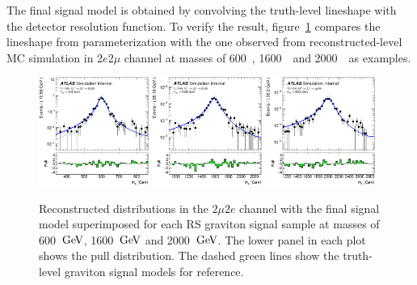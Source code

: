 The final signal model is obtained by convolving the truth-level lineshape with the detector resolution function.
To verify the result, figure~\ref{fig:graviton_reco_shape_2mu2e} compares the \mfl lineshape from parameterization with the one observed from reconstructed-level MC simulation in 2$e$2$\mu$ channel at masses of 600~\gev, 1600~\gev~and 2000~\gev~as examples.

\begin{figure}[htbp]
    \centering
    \includegraphics[width=0.32\textwidth]{figures/HMHZZ/signal/RSGraviton/graviton_reco_shape_m4l_constrained_HM_600GeV_2mu2e.eps}
    \includegraphics[width=0.32\textwidth]{figures/HMHZZ/signal/RSGraviton/graviton_reco_shape_m4l_constrained_HM_1600GeV_2mu2e.eps}
    \includegraphics[width=0.32\textwidth]{figures/HMHZZ/signal/RSGraviton/graviton_reco_shape_m4l_constrained_HM_2000GeV_2mu2e.eps}
    \caption{Reconstructed \mfl distributions in the $2\mu 2e$ channel with the final signal
        model superimposed for each RS graviton signal sample at masses of 600~$\text{Ge\kern -0.1em V}$, 1600~$\text{Ge\kern -0.1em V}$ and 2000~$\text{Ge\kern -0.1em V}$. The lower panel in each plot shows
        the pull distribution. The dashed green lines show the truth-level graviton signal models for reference.}
    \label{fig:graviton_reco_shape_2mu2e}
\end{figure}
